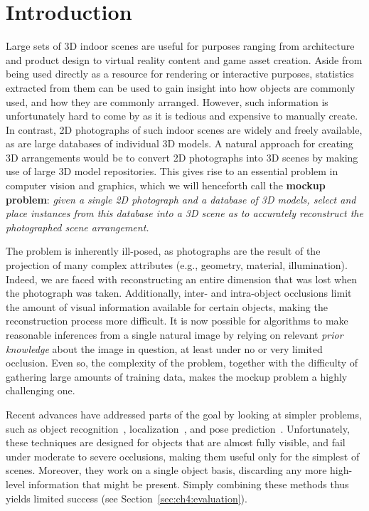 \documentclass[10pt,twocolumn,letterpaper]{article}
\begin{document}
\section{Introduction}
Large sets of 3D indoor scenes are useful for purposes ranging from
architecture and product design to virtual reality content and game asset
creation. Aside from being used directly as a resource for rendering or interactive purposes,
statistics extracted from them can be used to gain insight into
how objects are commonly used, and how they are commonly arranged. 
However, such information is unfortunately hard to come by as it is tedious and expensive to manually
create. In contrast, 2D photographs of such indoor scenes are widely and freely
available, as are large databases of individual 3D models. A natural approach for creating 3D arrangements would be to convert 2D photographs into 3D scenes by making use of large 3D model repositories.
This gives rise to an essential problem in computer vision and graphics, which
we will henceforth call the {\bf mockup problem}: {\em given a single 2D photograph
and a database of 3D models, select and place instances from this database into a 3D scene
as to accurately reconstruct the photographed scene arrangement. }

The problem is inherently ill-posed, as photographs are the result of the
projection of many complex attributes (e.g.,  geometry, material, illumination).
Indeed, we are faced with reconstructing an entire dimension that was lost when the
photograph was taken. Additionally, inter- and intra-object occlusions limit
the amount of visual information available for certain objects, making the
reconstruction process more difficult. It is now possible for algorithms to make reasonable inferences from a single natural image by relying
on relevant \emph{prior knowledge} about the image in question, at least under no or very limited occlusion. Even so, the
complexity of the problem, together with the difficulty of gathering large
amounts of training data, makes the mockup problem a highly challenging one.

Recent advances have addressed parts of the goal by looking at simpler problems,
such as object recognition~\cite{He:2016:CVPR}, localization~\cite{Ren:2015:NIPS}, and pose prediction~\cite{Wu:2016:ECCV}. Unfortunately,
these techniques are designed for objects that are almost fully visible, and
fail under moderate to severe occlusions, making them useful only for the
simplest of scenes. Moreover, they work on a single object basis, discarding
any more high-level information that might be present. Simply combining these
methods thus yields limited success (see Section~\ref{sec:ch4:evaluation}).
\end{document}
